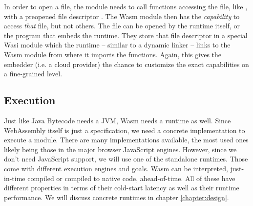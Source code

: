 In order to open a file, the module needs to call functions accessing the file, like , with a preopened file descriptor \cite{Clark2019}. The Wasm module then has the \emph{capability} to access \emph{that} file, but not others. The file can be opened by the runtime itself, or the program that embeds the runtime. They store that file descriptor in a special Wasi module which the runtime -- similar to a dynamic linker -- links to the Wasm module from where it imports the functions. Again, this gives the embedder (i.e. a cloud provider) the chance to customize the exact capabilities on a fine-grained level.


\subsection{Execution}

Just like Java Bytecode needs a JVM, Wasm needs a runtime as well. Since WebAssembly itself is just a specification, we need a concrete implementation to execute a module. There are many implementations available, the most used ones likely being those in the major browser JavaScript engines. However, since we don't need JavaScript support, we will use one of the standalone runtimes. Those come with different execution engines and goals. Wasm can be interpreted, just-in-time compiled or compiled to native code, ahead-of-time. All of these have different properties in terms of their cold-start latency as well as their runtime performance. We will discuss concrete runtimes in chapter \ref{chapter:design}.
